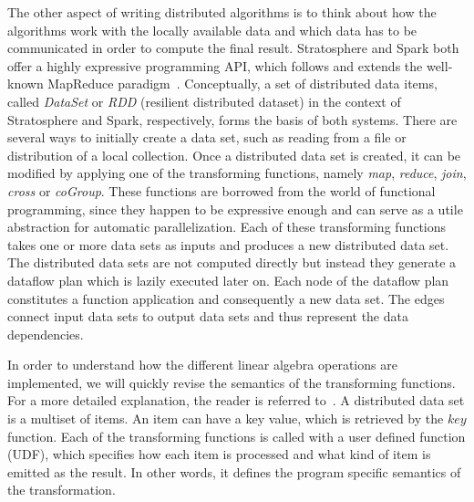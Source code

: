 The other aspect of writing distributed algorithms is to think about how the algorithms work with the locally available data and which data has to be communicated in order to compute the final result.
Stratosphere and Spark both offer a highly expressive programming API, which follows and extends the well-known MapReduce paradigm~\cite{dean:c2008a}.
Conceptually, a set of distributed data items, called \emph{DataSet} or \emph{RDD} (resilient distributed dataset) in the context of Stratosphere and Spark, respectively, forms the basis of both systems.
There are several ways to initially create a data set, such as reading from a file or distribution of a local collection.
Once a distributed data set is created, it can be modified by applying one of the transforming functions, namely \emph{map}, \emph{reduce}, \emph{join}, \emph{cross} or \emph{coGroup}.
These functions are borrowed from the world of functional programming, since they happen to be expressive enough and can serve as a utile abstraction for automatic parallelization.
Each of these transforming functions takes one or more data sets as inputs and produces a new distributed data set.
The distributed data sets are not computed directly but instead they generate a dataflow plan which is lazily executed later on.
Each node of the dataflow plan constitutes a function application and consequently a new data set.
The edges connect input data sets to output data sets and thus represent the data dependencies.

In order to understand how the different linear algebra operations are implemented, we will quickly revise the semantics of the transforming functions.
For a more detailed explanation, the reader is referred to~\cite{zaharia:2012a,alexandrov:2011a,battre:2010a}.
A distributed data set is a multiset of items.
An item can have a key value, which is retrieved by the $key$ function.
Each of the transforming functions is called with a user defined function (UDF), which specifies how each item is processed and what kind of item is emitted as the result.
In other words, it defines the program specific semantics of the transformation.

